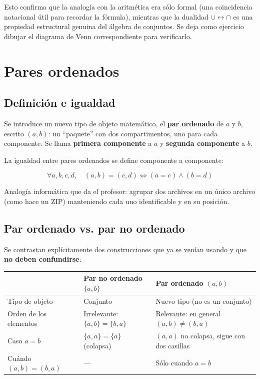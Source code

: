 \documentclass[12pt,a4paper]{article}
\begin{document}
Esto confirma que la analogía con la aritmética era sólo formal (una coincidencia notacional útil para recordar la fórmula), mientras que la dualidad $\cup \leftrightarrow \cap$ es una propiedad estructural genuina del álgebra de conjuntos. Se deja como ejercicio dibujar el diagrama de Venn correspondiente para verificarlo.

\section{Pares ordenados}
\label{sec:pares}

\subsection{Definición e igualdad}

Se introduce un nuevo tipo de objeto matemático, el \textbf{par ordenado} de $a$ y $b$, escrito $(a,b)$: un ``paquete'' con dos compartimentos, uno para cada componente. Se llama \textbf{primera componente} a $a$ y \textbf{segunda componente} a $b$.

La igualdad entre pares ordenados se define componente a componente:

\begin{keybox}
$$\boxed{\forall a,b,c,d,\quad (a,b) = (c,d) \iff (a=c) \wedge (b=d)}$$
\end{keybox}

Analogía informática que da el profesor: agrupar dos archivos en un único archivo (como hace un ZIP) manteniendo cada uno identificable y en su posición.

\subsection{Par ordenado vs. par no ordenado}

Se contrastan explícitamente dos construcciones que ya se venían usando y que \textbf{no deben confundirse}:

\begin{table}[H]
\centering
\begin{tabularx}{\textwidth}{@{}p{3.1cm}XX@{}}
\toprule
 & Par \textbf{no ordenado} $\{a,b\}$ & Par \textbf{ordenado} $(a,b)$ \\
\midrule
Tipo de objeto & Conjunto & Nuevo tipo (no es un conjunto) \\
Orden de los elementos & Irrelevante: $\{a,b\}=\{b,a\}$ & Relevante: en general $(a,b)\ne(b,a)$ \\
Caso $a=b$ & $\{a,a\}=\{a\}$ (colapsa) & $(a,a)$ no colapsa, sigue con dos casillas \\
Cuándo $(a,b)=(b,a)$ & --- & Sólo cuando $a=b$ \\
\bottomrule
\end{tabularx}
\end{table}
\end{document}

